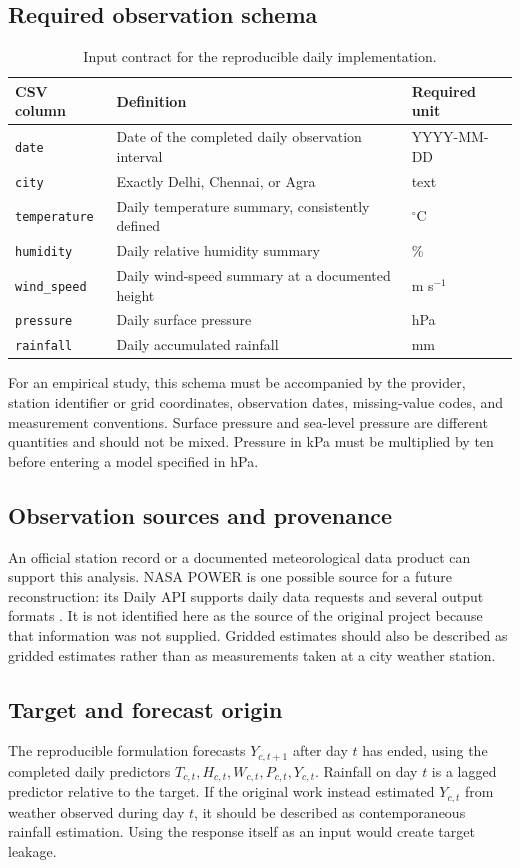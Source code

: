 \documentclass[11pt,a4paper]{article}
\begin{document}
\subsection{Required observation schema}
\begin{table}[h!]\centering\small
\begin{tabularx}{\textwidth}{@{}lXl@{}}\toprule
CSV column & Definition & Required unit\\\midrule
\texttt{date} & Date of the completed daily observation interval & YYYY-MM-DD\\
\texttt{city} & Exactly Delhi, Chennai, or Agra & text\\
\texttt{temperature} & Daily temperature summary, consistently defined & $^\circ$C\\
\texttt{humidity} & Daily relative humidity summary & \%\\
\texttt{wind\_speed} & Daily wind-speed summary at a documented height & m s$^{-1}$\\
\texttt{pressure} & Daily surface pressure & hPa\\
\texttt{rainfall} & Daily accumulated rainfall & mm\\\bottomrule
\end{tabularx}
\caption{Input contract for the reproducible daily implementation.}
\end{table}
For an empirical study, this schema must be accompanied by the provider, station identifier or grid coordinates, observation dates, missing-value codes, and measurement conventions. Surface pressure and sea-level pressure are different quantities and should not be mixed. Pressure in kPa must be multiplied by ten before entering a model specified in hPa.

\subsection{Observation sources and provenance}
An official station record or a documented meteorological data product can support this analysis. NASA POWER is one possible source for a future reconstruction: its Daily API supports daily data requests and several output formats \cite{nasa}. It is not identified here as the source of the original project because that information was not supplied. Gridded estimates should also be described as gridded estimates rather than as measurements taken at a city weather station.

\subsection{Target and forecast origin}
The reproducible formulation forecasts $Y_{c,t+1}$ after day $t$ has ended, using the completed daily predictors $T_{c,t},H_{c,t},W_{c,t},P_{c,t},Y_{c,t}$. Rainfall on day $t$ is a lagged predictor relative to the target. If the original work instead estimated $Y_{c,t}$ from weather observed during day $t$, it should be described as contemporaneous rainfall estimation. Using the response itself as an input would create target leakage.
\end{document}
